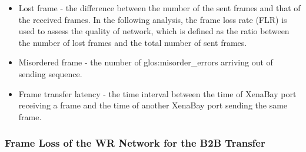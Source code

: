 \begin{itemize}
    \item Lost frame - the difference between the number of the sent frames and that of the received frames. In the following analysis, the frame loss rate (\gls{FLR}) is used to assess the quality of network, which is defined as the ratio between the number of lost frames and the total number of sent frames. 

    \item Misordered frame - the number of \gls{glos:misorder_error}s arriving out of sending sequence.
	\item Frame transfer latency - the time interval between the time of XenaBay port receiving a frame and the time of another XenaBay port sending the same frame.
\end{itemize}

\subsubsection{Frame Loss of the WR Network for the B2B Transfer} 

